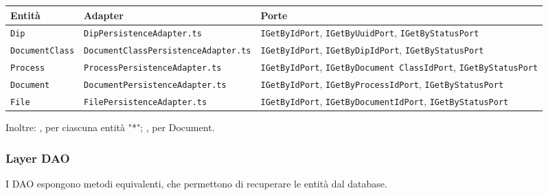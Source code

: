\begin{table}[H]
  \centering
  \footnotesize
  \setlength{\tabcolsep}{4pt}
  \renewcommand{\arraystretch}{1.5}
  \begin{tabularx}{\textwidth}{|l|l|Y|}
    \hline
    \textbf{Entità} & \textbf{Adapter} & \textbf{Porte} \\
    \hline
    \texttt{Dip} & \texttt{DipPersistenceAdapter.ts} & 
      \texttt{IGetByIdPort}, \texttt{IGetByUuidPort}, \texttt{IGetByStatusPort} \\
    \hline
    \texttt{DocumentClass} & \texttt{DocumentClassPersistenceAdapter.ts} & 
      \texttt{IGetByIdPort}, \texttt{IGetByDipIdPort}, \texttt{IGetByStatusPort} \\
    \hline
    \texttt{Process} & \texttt{ProcessPersistenceAdapter.ts} & 
      \texttt{IGetByIdPort}, \texttt{IGetByDocument ClassIdPort}, \texttt{IGetByStatusPort} \\
    \hline
    \texttt{Document} & \texttt{DocumentPersistenceAdapter.ts} & 
      \texttt{IGetByIdPort}, \texttt{IGetByProcessIdPort}, \texttt{IGetByStatusPort} \\
    \hline
    \texttt{File} & \texttt{FilePersistenceAdapter.ts} & 
      \texttt{IGetByIdPort}, \texttt{IGetByDocumentIdPort}, \texttt{IGetByStatusPort} \\
    \hline
  \end{tabularx}
  \label{tab:browsing:repositories}
\end{table}

\noindent
Inoltre: ,  per ciascuna entità "*"; , 
 per Document.

\subsubsection{Layer DAO}
\label{sec:browsing:dao}

\noindent
I DAO espongono metodi equivalenti, che permettono di recuperare le entità dal database.


